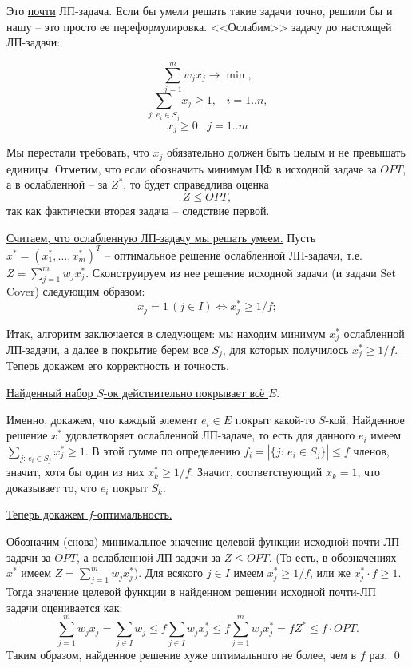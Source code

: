 Это \underline{почти} ЛП-задача. Если бы умели решать такие задачи точно, решили бы и нашу -- это просто ее переформулировка. <<Ослабим>> задачу до настоящей ЛП-задачи:

$$\sum_{j=1}^m w_j x_j \rightarrow \min,$$
$$\sum_{j:\, e_i \in S_j} x_j \geq 1, \;\;\; i=1..n,$$
$$x_j \geq 0 \;\;\; j=1..m$$

Мы перестали требовать, что $x_j$ обязательно должен быть целым и не превышать единицы. Отметим, что если обозначить минимум ЦФ в исходной задаче за $OPT$, а в ослабленной -- за $Z^*$, то будет справедлива оценка $$Z \leq OPT,$$ так как фактически вторая задача -- следствие первой.


\underline{Считаем, что ослабленную ЛП-задачу мы решать умеем.} Пусть $x^* = (x_1^*, \ldots, x_m^*)^T$ -- оптимальное решение ослабленной ЛП-задачи, т.е. $Z = \sum\limits_{j=1}^m w_j x_j^*$. Сконструируем из нее решение исходной задачи (и задачи Set Cover) следующим образом:
$$x_j = 1\, (j \in I) \iff x_j^* \geq 1/f;$$

Итак, алгоритм заключается в следующем: мы находим минимум $x_j^*$ ослабленной ЛП-задачи, а далее в покрытие берем все $S_j$, для которых получилось $x_j^* \geq 1/f$. Теперь докажем его корректность и точность.

\underline{Найденный набор $S$-ок действительно покрывает всё $E$}.

Именно, докажем, что каждый элемент $e_i \in E$ покрыт какой-то $S$-кой. Найденное решение $x^*$ удовлетворяет ослабленной ЛП-задаче, то есть для данного $e_i$ имеем $\sum\limits_{j: \, e_i \in S_j} x_j^* \geq 1$. В этой сумме по определению $f_i = \left|\{j: \, e_i \in S_j\}\right| \leq f$ членов, значит, хотя бы один из них $x_k^*\geq 1/f$. Значит, соответствующий $x_k = 1$, что доказывает то, что $e_i$ покрыт $S_k$.

\underline{Теперь докажем $f$-оптимальность.} 

Обозначим (снова) минимальное значение целевой функции исходной почти-ЛП задачи за $OPT$, а ослабленной ЛП-задачи за $Z \leq OPT$.  (То есть, в обозначениях $x^*$ имеем $Z = \sum\limits_{j=1}^m w_j x_j^*$). Для всякого $j\in I$ имеем $x_j^* \geq 1/f$, или же $x_j^*\cdot f \geq 1$. Тогда значение целевой функции в найденном решении исходной почти-ЛП задачи оценивается как:
$$\sum_{j=1}^m w_j x_j = \sum_{j \in I} w_j \leq f \sum_{j \in I} w_j x_j^* \leq f \sum_{j=1}^m w_j x_j^* = f Z^* \leq f \cdot OPT.$$ Таким образом, найденное решение хуже оптимального не более, чем в $f$ раз. \qed

